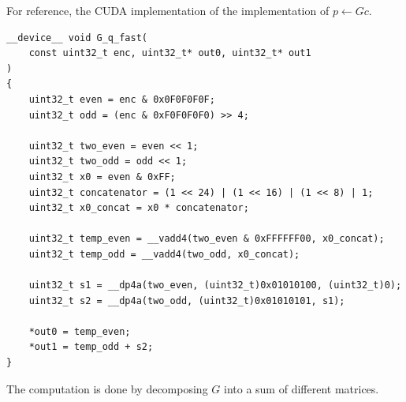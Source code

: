 \documentclass{article}
\theoremstyle{plain}
\theoremstyle{definition}
\theoremstyle{remark}
\begin{document}
For reference, the CUDA implementation of the implementation of $p\leftarrow Gc$.

\begin{lstlisting}
__device__ void G_q_fast(
    const uint32_t enc, uint32_t* out0, uint32_t* out1
)
{
    uint32_t even = enc & 0x0F0F0F0F;
    uint32_t odd = (enc & 0xF0F0F0F0) >> 4;

    uint32_t two_even = even << 1;
    uint32_t two_odd = odd << 1;
    uint32_t x0 = even & 0xFF;
    uint32_t concatenator = (1 << 24) | (1 << 16) | (1 << 8) | 1;
    uint32_t x0_concat = x0 * concatenator;

    uint32_t temp_even = __vadd4(two_even & 0xFFFFFF00, x0_concat);
    uint32_t temp_odd = __vadd4(two_odd, x0_concat);

    uint32_t s1 = __dp4a(two_even, (uint32_t)0x01010100, (uint32_t)0);
    uint32_t s2 = __dp4a(two_odd, (uint32_t)0x01010101, s1);

    *out0 = temp_even;
    *out1 = temp_odd + s2;
}
\end{lstlisting}
The computation is done by decomposing $G$ into a sum of different matrices.
\end{document}
